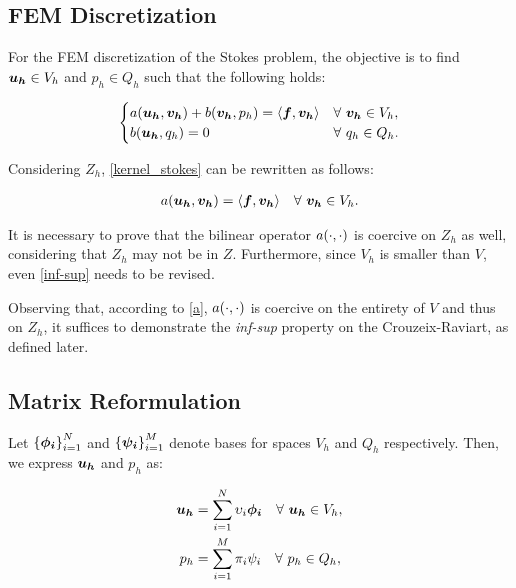 \subsection{FEM Discretization}

For the FEM discretization of the Stokes problem, the objective is to find $\bm{u_h} \in V_h$ and $p_h \in Q_h$ such that the following holds:

\begin{gather} \label{fem_stokes}
    \begin{cases}
        a(\bm{u_h}, \bm{v_h}) + b(\bm{v_h}, p_h) = \langle \bm{f}, \bm{v_h} \rangle & \forall ~ \bm{v_h} \in V_h, \\
        b(\bm{u_h}, q_h) = 0 & \forall ~ q_h \in Q_h.
    \end{cases}
\end{gather}

Considering $Z_h$, \eqref{kernel_stokes} can be rewritten as follows:

\begin{gather} \label{fem_kernel}
    a(\bm{u_h}, \bm{v_h}) = \langle \bm{f}, \bm{v_h} \rangle \quad \forall ~ \bm{v_h} \in V_h.
\end{gather}

It is necessary to prove that the bilinear operator $a(\cdot, \cdot)$ is coercive on $Z_h$ as well, considering that $Z_h$ may not be in $Z$. Furthermore, since $V_h$ is smaller than $V$, even \eqref{inf-sup} needs to be revised. 

Observing that, according to \eqref{a}, $a(\cdot, \cdot)$ is coercive on the entirety of $V$ and thus on $Z_h$, it suffices to demonstrate the \textit{inf-sup} property on the Crouzeix-Raviart, as defined later.

\subsection{Matrix Reformulation}

Let $\left\{ \bm{\phi_i} \right\}_{i = 1}^N$ and $\left\{ \bm{\psi_i} \right\}_{i = 1}^M$ denote bases for spaces $V_h$ and $Q_h$ respectively. Then, we express $\bm{u_h}$ and $p_h$ as:

\begin{align}
    \bm{u_h} &= \sum_{i = 1}^N \upsilon_i \bm{\phi_i} \quad \forall ~ \bm{u_h} \in V_h, \\
    p_h &= \sum_{i = 1}^M \pi_i \psi_i \quad \forall ~ p_h \in Q_h,
\end{align}

